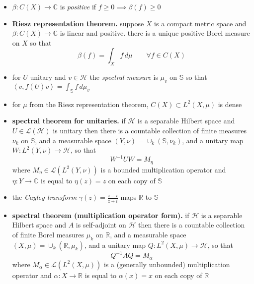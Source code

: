 \documentclass[11pt]{article}
\newcommand{\cH}{\mathcal{H}}
\newcommand{\cL}{\mathcal{L}}
\newcommand{\CC}{\mathbb{C}}
\newcommand{\RR}{\mathbb{R}}
\renewcommand{\SS}{\mathbb{S}}
\newcommand{\ip}[2]{\left<#1,#2\right>}
\newcommand{\ds}{\displaystyle}
\begin{document}
\begin{itemize}[leftmargin=10mm,itemsep=0mm]
\item[\df{105}] $\beta:C(X)\to\CC$ is \emph{positive} if $f\ge 0 \implies \beta(f)\ge 0$
\item[\ft{105}] \textbf{Riesz representation theorem.} suppose $X$ is a compact metric space and $\beta:C(X) \to \CC$ is linear and positive. there is a unique positive Borel measure on $X$ so that
	$$\beta(f) = \int_X f\,d\mu \qquad \forall f \in C(X)$$
\item[\df{105}] for $U$ unitary and $v\in\cH$ the \emph{spectral measure} is $\mu_v$ on $\SS$ so that $\ip{v}{f(U)v} = \int_{\SS} f\,d\mu_v$
\item[\ft{106}] for $\mu$ from the Riesz representation theorem, $C(X) \subset L^2(X,\mu)$ is dense
\item[\ft{107}] \textbf{spectral theorem for unitaries.} if $\cH$ is a separable Hilbert space and $U\in\cL(\cH)$ is unitary then there is a countable collection of finite measures $\nu_k$ on $\SS$, and a measurable space $(Y,\nu) = \cup_k (\SS,\nu_k)$, and a unitary map $W:L^2(Y,\nu) \to \cH$, so that
	$$W^{-1} U W = M_\eta$$
where $M_\eta \in \cL(L^2(Y,\nu))$ is a bounded multiplication operator and $\eta:Y\to \CC$ is equal to $\eta(z)=z$ on each copy of $\SS$
\item[\df{108}] the \emph{Cayley transform} $\ds \gamma(z) = \frac{z-i}{z+i}$ maps $\RR$ to $\SS$
\item[\ft{108}] \textbf{spectral theorem (multiplication operator form).} if $\cH$ is a separable Hilbert space and $A$ is self-adjoint on $\cH$ then there is a countable collection of finite Borel measures $\mu_k$ on $\RR$, and a measurable space $(X,\mu) = \cup_k (\RR,\mu_k)$, and a unitary map $Q:L^2(X,\mu) \to \cH$, so that
	$$Q^{-1} A Q = M_\alpha$$
where $M_\alpha \in \cL(L^2(X,\mu))$ is a (generally unbounded) multiplication operator and $\alpha:X\to \RR$ is equal to $\alpha(x)=x$ on each copy of $\RR$
\end{itemize}
\end{document}

